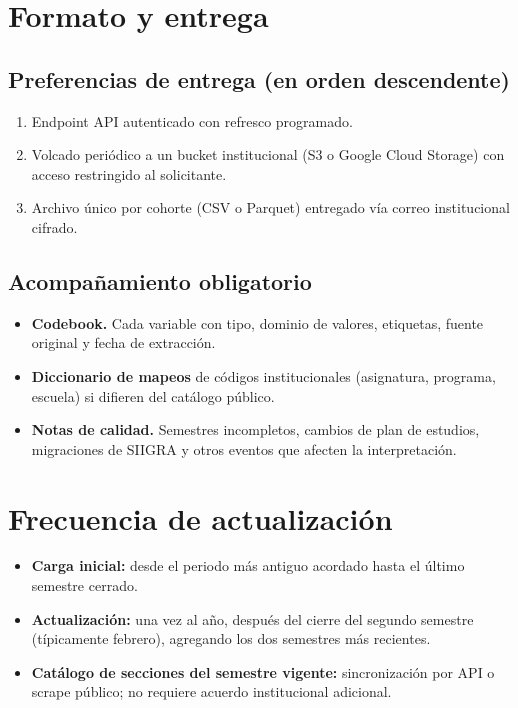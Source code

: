 \documentclass[11pt,a4paper]{article}
\begin{document}
\section{Formato y entrega}

\subsection*{Preferencias de entrega (en orden descendente)}

\begin{enumerate}
\item Endpoint API autenticado con refresco programado.
\item Volcado periódico a un bucket institucional (S3 o Google Cloud Storage) con acceso restringido al solicitante.
\item Archivo único por cohorte (CSV o Parquet) entregado vía correo institucional cifrado.
\end{enumerate}

\subsection*{Acompañamiento obligatorio}

\begin{itemize}
\item \textbf{Codebook.} Cada variable con tipo, dominio de valores, etiquetas, fuente original y fecha de extracción.
\item \textbf{Diccionario de mapeos} de códigos institucionales (asignatura, programa, escuela) si difieren del catálogo público.
\item \textbf{Notas de calidad.} Semestres incompletos, cambios de plan de estudios, migraciones de SIIGRA y otros eventos que afecten la interpretación.
\end{itemize}

\section{Frecuencia de actualización}

\begin{itemize}
\item \textbf{Carga inicial:} desde el periodo más antiguo acordado hasta el último semestre cerrado.
\item \textbf{Actualización:} una vez al año, después del cierre del segundo semestre (típicamente febrero), agregando los dos semestres más recientes.
\item \textbf{Catálogo de secciones del semestre vigente:} sincronización por API o scrape público; no requiere acuerdo institucional adicional.
\end{itemize}
\end{document}
